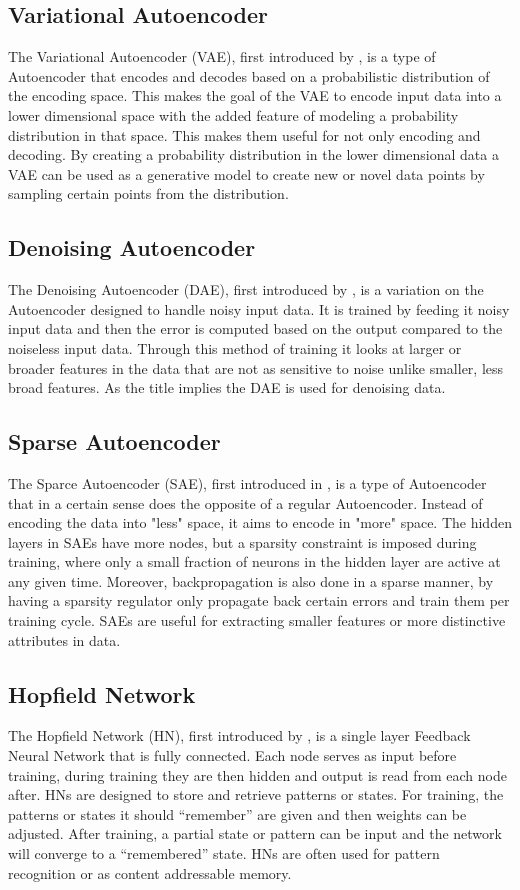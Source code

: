 \documentclass[conference]{IEEEtran}
\begin{document}
\subsection{Variational Autoencoder} \label{VAE}
The Variational Autoencoder (VAE), first introduced by \cite{kingma2013auto}, is a type of Autoencoder that encodes and decodes based on a probabilistic distribution of the encoding space. This makes the goal of the VAE to encode input data into a lower dimensional space with the added feature of modeling a probability distribution in that space. This makes them useful for not only encoding and decoding. By creating a probability distribution in the lower dimensional data a VAE can be used as a generative model to create new or novel data points by sampling certain points from the distribution.

\subsection{Denoising Autoencoder} \label{DAE}
The Denoising Autoencoder (DAE), first introduced by \cite{vincent2008extracting}, is a variation on the Autoencoder designed to handle noisy input data. It is trained by feeding it noisy input data and then the error is computed based on the output compared to the noiseless input data. Through this method of training it looks at larger or broader features in the data that are not as sensitive to noise unlike smaller, less broad features. As the title implies the DAE is used for denoising data.

\subsection{Sparse Autoencoder} \label{SAE}
The Sparce Autoencoder (SAE), first introduced in \cite{ranzato2006efficient}, is a type of Autoencoder that in a certain sense does the opposite of a regular Autoencoder. Instead of encoding the data into "less" space, it aims to encode in "more" space. The hidden layers in SAEs have more nodes, but a sparsity constraint is imposed during training, where only a small fraction of neurons in the hidden layer are active at any given time. Moreover, backpropagation is also done in a sparse manner, by having a sparsity regulator only propagate back certain errors and train them per training cycle. SAEs are useful for extracting smaller features or more distinctive attributes in data.

\subsection{Hopfield Network} \label{HN}
The Hopfield Network (HN), first introduced by \cite{hopfield1982neural}, is a single layer Feedback Neural Network that is fully connected. Each node serves as input before training, during training they are then hidden and output is read from each node after. HNs are designed to store and retrieve patterns or states. For training, the patterns or states it should ``remember'' are given and then weights can be adjusted. After training, a partial state or pattern can be input and the network will converge to a ``remembered'' state. HNs are often used for pattern recognition or as content addressable memory.
\end{document}
